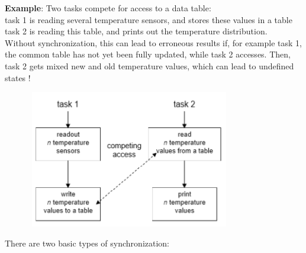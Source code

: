 \textbf{ Example}: Two tasks compete for access to a data table:\\

task 1 is reading several temperature sensors, and stores these values in a table\\
task 2 is reading this table, and prints out the temperature distribution.\\

Without synchronization, this can lead to erroneous results if, for example task 1, the common table has not yet been fully updated, while task 2 accesses. Then, task 2 gets mixed new and old temperature values, which can lead to undefined states !

 	\begin{figure}[h]
    \centering
    \includegraphics[width=9cm, height=6cm]{Images/image102.png}
    \label{fig:Fig }
    \end{figure}

\newpage  
There are two basic types of synchronization:\\

